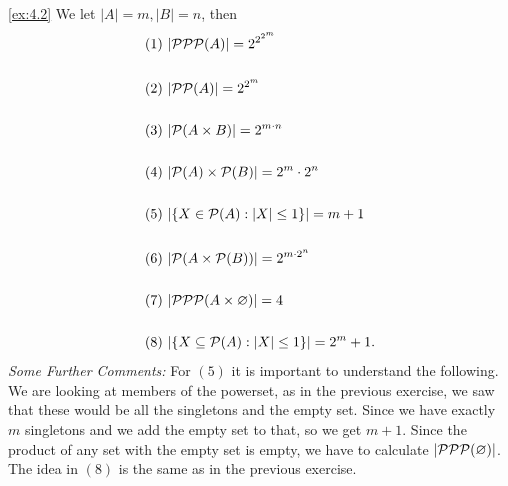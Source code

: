 \begin{solution}\label{sol:4.2}\ref{ex:4.2}
    We let $\lvert A \rvert= m ,\lvert B \rvert= n$, then 
    $$
    \begin{aligned}
        &(1)~\lvert \mathcal{P}\mathcal{P}\mathcal{P}(A) \rvert=2^{2^{2^{m}}}\\\\
        &(2)~\lvert \mathcal{P}\mathcal{P}(A) \rvert=2^{2^{m}}\\\\
        &(3)~\lvert \mathcal{P}(A\times B) \rvert=2^{m\cdot n}\\\\
        &(4)~\lvert \mathcal{P}(A)\times \mathcal{P}(B) \rvert=2^{m}\cdot 2^{n}\\\\
        &(5)~\lvert \{ X\in\mathcal{P}(A):\lvert X \rvert\le 1 \} \rvert= m+1\\\\
        &(6)~\lvert \mathcal{P}(A\times\mathcal{P}(B)) \rvert=2^{m\cdot 2^{n}}\\\\
        &(7)~ \lvert \mathcal{P}\mathcal{P}\mathcal{P}(A\times\varnothing) \rvert=4\\\\
        &(8)~\lvert \{ X\subseteq\mathcal{P}(A):\lvert X \rvert\le 1 \} \rvert=2^{m}+1.
    \end{aligned}
    $$
    \emph{Some Further Comments:} For $(5)$ it is important to understand the following. We are looking at members of the powerset, as in the previous exercise, we saw that these would be all the singletons and the empty set. Since we have exactly $m$ singletons and we add the empty set to that, so we get $m+1$. 
    Since the product of any set with the empty set is empty, we have to calculate $\lvert \mathcal{P}\mathcal{P}\mathcal{P}(\varnothing) \rvert$. The idea in $(8)$ is the same as in the previous exercise. 
\end{solution}